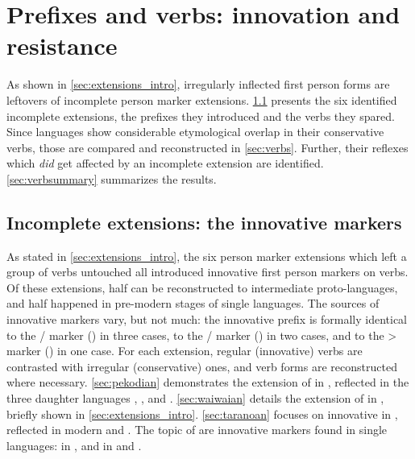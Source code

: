 \section{Prefixes and verbs: innovation and resistance}
\label{sec:data}
As shown in \cref{sec:extensions_intro}, irregularly inflected first person forms are leftovers of incomplete person marker extensions.
\cref{sec:extensions} presents the six identified incomplete extensions, the prefixes they introduced and the verbs they spared.
Since languages show considerable etymological overlap in their conservative verbs, those are compared and reconstructed in \cref{sec:verbs}.
Further, their reflexes which \textit{did} get affected by an incomplete extension are identified.
\cref{sec:verbsummary} summarizes the results.

\subsection{Incomplete extensions: the innovative \texorpdfstring{}{Sa} markers}
\label{sec:extensions}
As stated in \cref{sec:extensions_intro}, the six person marker extensions which left a group of verbs untouched all introduced innovative first person markers on  verbs.
Of these extensions, half can be reconstructed to intermediate proto-languages, and half happened in pre-modern stages of single languages.
The sources of innovative markers vary, but not much: the innovative  prefix is formally identical to the / marker (\PC {}) in three cases, to the / marker (\PC {}) in two cases, and to the > marker (\PC {}) in one case.
For each extension, regular (innovative) verbs are contrasted with irregular (conservative) ones, and verb forms are reconstructed where necessary.
\cref{sec:pekodian} demonstrates the extension of  in \PPek, reflected in the three daughter languages \arara, \ikpeng, and \bakairi.
\cref{sec:waiwaian} details the extension of  in \PWai, briefly shown in \cref{sec:extensions_intro}.
\cref{sec:taranoan} focuses on innovative  in \PTir, reflected in modern \trio and \akuriyo.
The topic of  are innovative  markers found in single languages:
 in \akuriyo, and  in \carijo and \yukpa.
 
